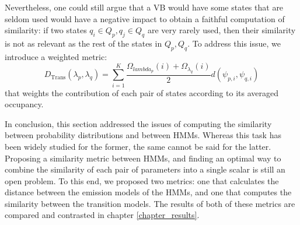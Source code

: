 \documentclass[../main.tex]{subfiles}
\begin{document}
\par Nevertheless, one could still argue that a VB would have some states that are seldom used would have a negative impact to obtain a faithful computation of similarity: if two states $q_i \in Q_p, q_j \in Q_q$ are very rarely used, then their similarity is not as relevant as the rest of the states in $Q_p, Q_q$. To address this issue, we introduce a weighted metric:
\begin{equation} \label{eq:hmmdist}
D_{\text{Trans}}(\lambda_p, \lambda_q) = \sum_{i=1}^K \frac{\Omega_{lambda_p}(i) + \Omega_{\lambda_q}(i)}{2} d(\psi_{p, i}, \psi_{q, i})
\end{equation}
that weights the contribution of each pair of states according to its averaged occupancy.
\par In conclusion, this section addressed the issues of computing the similarity between probability distributions and between HMMs. Whereas this task has been widely studied for the former, the same cannot be said for the latter. Proposing a similarity metric between HMMs, and finding an optimal way to combine the similarity of each pair of parameters into a single scalar is still an open problem. To this end, we proposed two metrics: one that calculates the distance between the emission models of the HMMs, and one that computes the similarity between the transition models. The results of both of these metrics are compared and contrasted in chapter \ref{chapter_results}.
\end{document}
